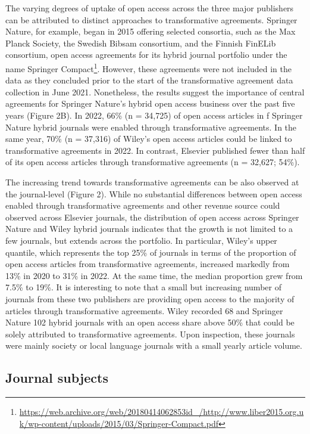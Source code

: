 \documentclass[a4paper,man,floatsintext,longtable,noextraspace,12pt]{apa6}
\begin{document}
The varying degrees of uptake of open access across the three major
publishers can be attributed to distinct approaches to transformative
agreements. Springer Nature, for example, began in 2015 offering
selected consortia, such as the Max Planck Society, the Swedish Bibsam
consortium, and the Finnish FinELib consortium, open access agreements
for its hybrid journal portfolio under the name Springer
Compact\footnote{\url{https://web.archive.org/web/20180414062853id_/http://www.liber2015.org.uk/wp-content/uploads/2015/03/Springer-Compact.pdf}}.
However, these agreements were not included in the data as they
concluded prior to the start of the transformative agreement data
collection in June 2021. Nonetheless, the results suggest the importance
of central agreements for Springer Nature's hybrid open access business
over the past five years (Figure 2B). In 2022, 66\% (n = 34,725) of open
access articles in f Springer Nature hybrid journals were enabled
through transformative agreements. In the same year, 70\% (n = 37,316)
of Wiley's open access articles could be linked to transformative
agreements in 2022. In contrast, Elsevier published fewer than half of
its open access articles through transformative agreements (n = 32,627;
54\%).

The increasing trend towards transformative agreements can be also
observed at the journal-level (Figure 2). While no substantial
differences between open access enabled through transformative
agreements and other revenue source could observed across Elsevier
journals, the distribution of open access across Springer Nature and
Wiley hybrid journals indicates that the growth is not limited to a few
journals, but extends across the portfolio. In particular, Wiley's upper
quantile, which represents the top 25\% of journals in terms of the
proportion of open access articles from transformative agreements,
increased markedly from 13\% in 2020 to 31\% in 2022. At the same time,
the median proportion grew from 7.5\% to 19\%. It is interesting to note
that a small but increasing number of journals from these two publishers
are providing open access to the majority of articles through
transformative agreements. Wiley recorded 68 and Springer Nature 102
hybrid journals with an open access share above 50\% that could be
solely attributed to transformative agreements. Upon inspection, these
journals were mainly society or local language journals with a small
yearly article volume.

\hypertarget{journal-subjects}{%
\subsection{Journal subjects}\label{journal-subjects}}
\end{document}
